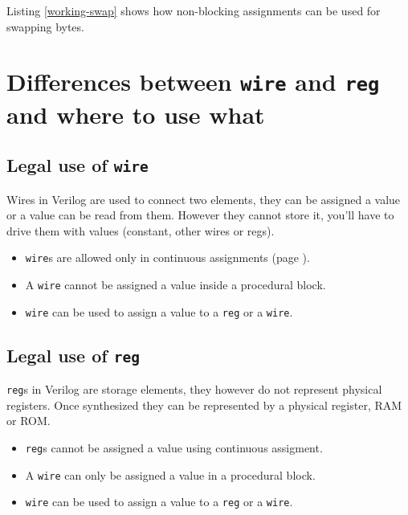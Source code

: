 \documentclass[a4paper,10pt]{article}
\theoremstyle{mytheor}
\newcommand{
  \insertverilog}[3]{
  
}
\begin{document}
Listing \ref{working-swap} shows how non-blocking assignments can be
used for swapping bytes.

\insertverilog{./verilog_files/workingSwap.v}{working-swap}{Swapping bytes using non-blocking assignment\, it works!}   

\section{Differences between \lstinline[style=verilog-inline-style]{wire} and \lstinline[style=verilog-inline-style]{reg} and where to use what}
\subsection{Legal use of \lstinline[style=verilog-inline-style]{wire}}
Wires in Verilog are used to connect two elements, they can be assigned a value or a value can be read from them. However they cannot store it, you'll have to drive them with values (constant, other wires or regs).

\begin{itemize}
\item \lstinline[style=verilog-inline-style]{wire}s are allowed only in continuous assignments (page \pageref{continuous-assignment}).
\item A \lstinline[style=verilog-inline-style]{wire} cannot be assigned a value inside a procedural block.
\item \lstinline[style=verilog-inline-style]{wire} can be used to assign a value to a \lstinline[style=verilog-inline-style]{reg} or a \lstinline[style=verilog-inline-style]{wire}.
\end{itemize}

\subsection{Legal use of \lstinline[style=verilog-inline-style]{reg}}
\lstinline[style=verilog-inline-style]{reg}s in Verilog are storage elements, they however do not represent physical registers. Once synthesized they can be represented by a physical register, RAM or ROM.

 \begin{itemize}
 \item \lstinline[style=verilog-inline-style]{reg}s cannot be assigned a value using continuous assigment.
 \item A \lstinline[style=verilog-inline-style]{wire} can only be assigned a value in a procedural block.
 \item \lstinline[style=verilog-inline-style]{wire} can be used to assign a value to a \lstinline[style=verilog-inline-style]{reg} or a \lstinline[style=verilog-inline-style]{wire}.
\end{itemize}
\end{document}

